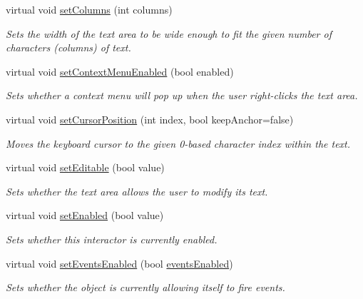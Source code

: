 \begin{DoxyCompactItemize}
virtual void \mbox{\hyperlink{classGTextArea_a3f29cc2956a84cdbce6327f1da4d86e9}{set\+Columns}} (int columns)
\begin{DoxyCompactList}\small\item\em Sets the width of the text area to be wide enough to fit the given number of characters (columns) of text. \end{DoxyCompactList}\item 
virtual void \mbox{\hyperlink{classGTextArea_a1a83404ffa5c72d747681b3505e73001}{set\+Context\+Menu\+Enabled}} (bool enabled)
\begin{DoxyCompactList}\small\item\em Sets whether a context menu will pop up when the user right-\/clicks the text area. \end{DoxyCompactList}\item 
virtual void \mbox{\hyperlink{classGTextArea_a5817e10a86be5cd41b3668d8fccb10e0}{set\+Cursor\+Position}} (int index, bool keep\+Anchor=false)
\begin{DoxyCompactList}\small\item\em Moves the keyboard cursor to the given 0-\/based character index within the text. \end{DoxyCompactList}\item 
virtual void \mbox{\hyperlink{classGTextArea_a008d7fd44fb3e7a6886cdaddbc3644a2}{set\+Editable}} (bool value)
\begin{DoxyCompactList}\small\item\em Sets whether the text area allows the user to modify its text. \end{DoxyCompactList}\item 
virtual void \mbox{\hyperlink{classGInteractor_ab831367dd84bbd579e02e55bacb21343}{set\+Enabled}} (bool value)
\begin{DoxyCompactList}\small\item\em Sets whether this interactor is currently enabled. \end{DoxyCompactList}\item 
virtual void \mbox{\hyperlink{classGObservable_afaa30b2a9e0f378fd1c70d2f1d0b8216}{set\+Events\+Enabled}} (bool \mbox{\hyperlink{classGInteractor_ac05ba5b92e2e5146d416fe7f842a0969}{events\+Enabled}})
\begin{DoxyCompactList}\small\item\em Sets whether the object is currently allowing itself to fire events. \end{DoxyCompactList}\item 

\end{DoxyCompactItemize}
